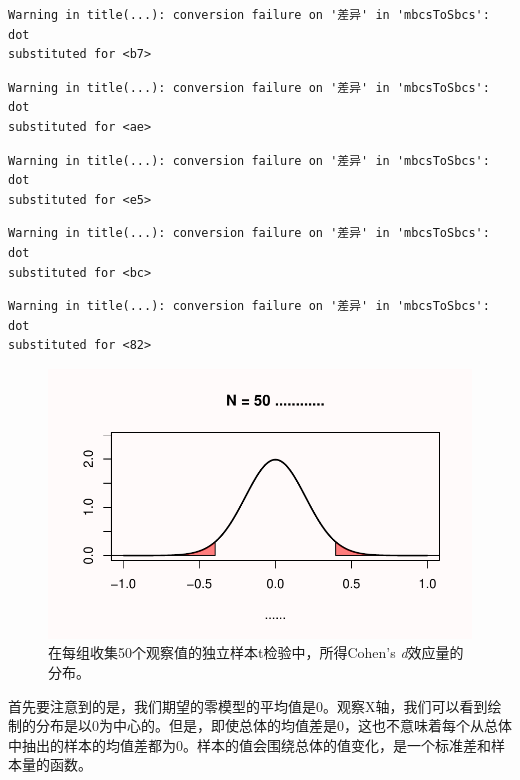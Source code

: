 \documentclass[
  letterpaper,
  DIV=11,
  numbers=noendperiod]{scrreprt}
\begin{document}
\begin{verbatim}
Warning in title(...): conversion failure on '差异' in 'mbcsToSbcs': dot
substituted for <b7>
\end{verbatim}

\begin{verbatim}
Warning in title(...): conversion failure on '差异' in 'mbcsToSbcs': dot
substituted for <ae>
\end{verbatim}

\begin{verbatim}
Warning in title(...): conversion failure on '差异' in 'mbcsToSbcs': dot
substituted for <e5>
\end{verbatim}

\begin{verbatim}
Warning in title(...): conversion failure on '差异' in 'mbcsToSbcs': dot
substituted for <bc>
\end{verbatim}

\begin{verbatim}
Warning in title(...): conversion failure on '差异' in 'mbcsToSbcs': dot
substituted for <82>
\end{verbatim}

\begin{figure}

{\centering \includegraphics[width=1\textwidth,height=\textheight]{01-pvalue_files/figure-pdf/fig-fig131-1.pdf}

}

\caption{\label{fig-fig131}在每组收集50个观察值的独立样本t检验中，所得Cohen's
\emph{d}效应量的分布。}

\end{figure}

首先要注意到的是，我们期望的零模型的平均值是0。观察X轴，我们可以看到绘制的分布是以0为中心的。但是，即使总体的均值差是0，这也不意味着每个从总体中抽出的样本的均值差都为0。样本的值会围绕总体的值变化，是一个标准差和样本量的函数。
\end{document}

